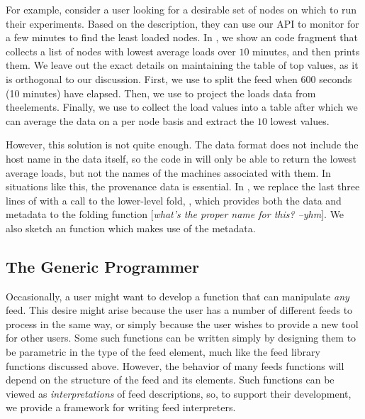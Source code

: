For example, consider a \planetlab user looking for a desirable set of nodes on which to run their experiments. Based on the \comon description, they can use our API to monitor \planetlab for a few minutes to find the least loaded nodes. In , we show an \ocaml code fragment that collects a list of nodes with lowest average loads over $10$ minutes, and then prints them. We leave out the exact details on maintaining the table of top values, as it is orthogonal to our 
discussion. First, we use  to split the feed when 600 seconds (10 minutes) have elapsed. Then, we use  to project the loads data from the\comon elements. Finally, we use  to collect the load values into a table after which we can average the data on a per node basis and extract the $10$ lowest values.

However, this solution is not quite enough. The \comon data format does not include the host name in the data itself, so the code in  will only be able to return the lowest average loads, but not the names of the machines associated with them. In situations like this, the provenance data is essential.  In , we  replace the last three lines of  with a call to the lower-level fold, , which provides both the data and metadata to the folding function [{\it what's the proper name for this? --yhm}]. We also sketch an  function which makes use of the metadata.

\subsection{The Generic Programmer}


Occasionally, a user might want to develop a function that can manipulate {\it any} feed. This desire might arise because the user has a number of different feeds to process in the same way, or simply because the user wishes to provide a new tool for other \padsd{} users. Some such functions can be written simply by designing them to be parametric in the type of the feed element, much like the feed library functions discussed above. However, the behavior of many feeds functions will depend on the structure of the feed and its elements. Such functions can be viewed as {\it interpretations} of feed descriptions, so, to support their development, we provide a framework for writing feed interpreters.

